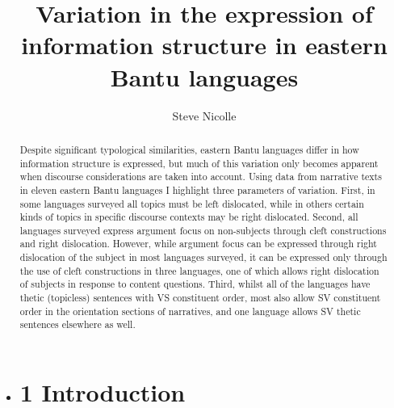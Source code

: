 \documentclass[output=paper]{langsci/langscibook}
\title{Variation in the expression of information structure in eastern {Bantu} languages}
\author{%
Steve Nicolle\affiliation{Canada Institute of Linguistics / SIL International} 
}
\begin{document}
\begin{abstract}
Despite significant typological similarities, eastern Bantu languages differ in how information structure is expressed, but much of this variation only becomes apparent when discourse considerations are taken into account. Using data from narrative texts in eleven eastern Bantu languages I highlight three parameters of variation. First, in some languages surveyed all topics must be left dislocated, while in others certain kinds of topics in specific discourse contexts may be right dislocated. Second, all languages surveyed express argument focus on non-subjects through cleft constructions and right dislocation. However, while argument focus can be expressed through right dislocation of the subject in most languages surveyed, it can be expressed only through the use of cleft constructions in three languages, one of which allows right dislocation of subjects in response to content questions. Third, whilst all of the languages have thetic (topicless) sentences with VS constituent order, most also allow SV constituent order in the orientation sections of narratives, and one language allows SV thetic sentences elsewhere as well.
\end{abstract}

\begin{itemize}
\item \chapter{1  Introduction}\end{itemize}
\end{document}
